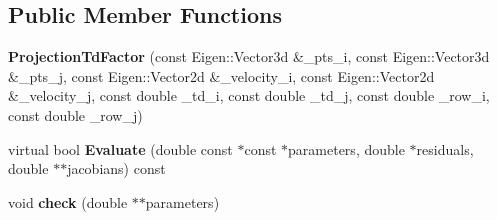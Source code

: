 \subsection*{Public Member Functions}
\begin{DoxyCompactItemize}
\item 
\mbox{\label{classProjectionTdFactor_a05f239cc95ee0532822e4d8399d4067e}} 
{\bfseries Projection\+Td\+Factor} (const Eigen\+::\+Vector3d \&\+\_\+pts\+\_\+i, const Eigen\+::\+Vector3d \&\+\_\+pts\+\_\+j, const Eigen\+::\+Vector2d \&\+\_\+velocity\+\_\+i, const Eigen\+::\+Vector2d \&\+\_\+velocity\+\_\+j, const double \+\_\+td\+\_\+i, const double \+\_\+td\+\_\+j, const double \+\_\+row\+\_\+i, const double \+\_\+row\+\_\+j)
\item 
\mbox{\label{classProjectionTdFactor_a1a74d1d8421bd31890bcb6f433c4010f}} 
virtual bool {\bfseries Evaluate} (double const $\ast$const $\ast$parameters, double $\ast$residuals, double $\ast$$\ast$jacobians) const
\item 
\mbox{\label{classProjectionTdFactor_ad542eac295b42db775042d00702584f7}} 
void {\bfseries check} (double $\ast$$\ast$parameters)
\end{DoxyCompactItemize}
